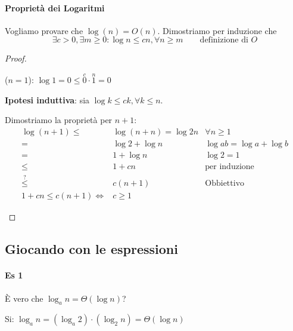             \paragraph{Proprietà dei Logaritmi}
                Vogliamo provare che $ \log(n) = O(n) $. Dimostriamo per induzione che
                $$
                    \exists c>0,\exists m\geq 0:\log n\leq cn,\forall n\geq m\qquad \text{definizione di }O
                $$
                \begin{proof}
                    \begin{basecase} ($ n=1 $):
                        $ \log 1 = 0 \leq \stackrel{c}0\cdot \stackrel{n}1 = 0 $
                    \end{basecase}
                    \textbf{Ipotesi induttiva}: sia $ \log k \leq ck, \forall k\leq n $.
                    \begin{inductivecase}
                        Dimostriamo la proprietà per $ n+1 $:
                        $$
                            \begin{aligned}
                                \log(n+1) \leq & \log(n+n) = \log 2n & \forall n\geq 1 \\
                                = & \log 2 + \log n \qquad & \log ab = \log a + \log b \\
                                = & 1 + \log n & \log 2 = 1 \\
                                \leq & 1 + cn & \text{per induzione} \\
                                \stackrel{?}{\leq} & c(n+1) & \text{Obbiettivo} \\
                                1+cn\leq c(n+1) \Leftrightarrow & c\geq 1
                            \end{aligned}
                        $$
                    \end{inductivecase}
                \end{proof}
        \subsection{Giocando con le espressioni}
            \paragraph{Es 1}
                È vero che $ \log_a n = \Theta(\log n) $?

                Si: $ \log_a n = (\log_a 2) \cdot (\log_2 n) = \Theta(\log n) $
            
